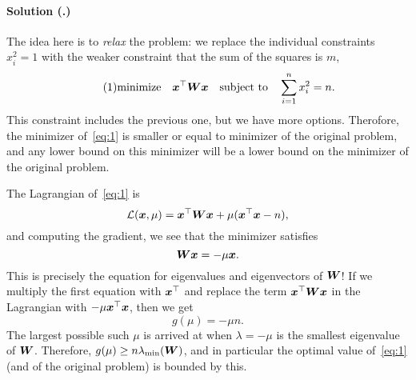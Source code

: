 \documentclass{article}
\newcounter{problemSheetNumber}
\newcounter{problems}
\renewcommand{\solution}[1]{\paragraph{Solution (\theproblemSheetNumber.\theproblems)}\addtocounter{problems}{1}\label{#1}}
\begin{document}

\solution{pr:2} The idea here is to {\em relax} the problem: we replace the individual constraints $x_i^2=1$ with the weaker constraint that the sum of the squares is $m$,
\begin{equation}\label{eq:1}\tag{1}
  \text{minimize}\quad \bm{x}^{\top}\bm{W}\bm{x} \quad\text{subject to}\quad \sum_{i=1}^n x_i^2 = n.
\end{equation}
This constraint includes the previous one, but we have more options. Therofore, the minimizer of~\eqref{eq:1} is smaller or equal to minimizer of the original problem, and any lower bound on this minimizer will be a lower bound on the minimizer of the original problem.

The Lagrangian of~\eqref{eq:1} is 
\begin{equation*}
  \mathcal{L}(\bm{x},\mu) = \bm{x}^{\top}\bm{W}\bm{x} + \mu (\bm{x}^{\top}\bm{x}-n),
\end{equation*}
and computing the gradient, we see that the minimizer satisfies
\begin{equation*}
  \bm{W}\bm{x} = -\mu \bm{x}.
\end{equation*}
This is precisely the equation for eigenvalues and eigenvectors of $\bm{W}$! 
If we multiply the first equation with $\bm{x}^{\top}$ and replace the term $\bm{x}^{\top}\bm{W}\bm{x}$ in the Lagrangian with $-\mu\bm{x}^{\top}\bm{x}$, then we get
\begin{equation*}
  g(\mu) = -\mu n.
\end{equation*}
The largest possible such $\mu$ is arrived at when $\lambda = -\mu$ is the smallest eigenvalue of $\bm{W}$. Therefore, $g(\mu) \geq n \lambda_{\text{min}}(\bm{W})$, and in particular the optimal value of~\eqref{eq:1} (and of the original problem) is bounded by this.
\end{document}
